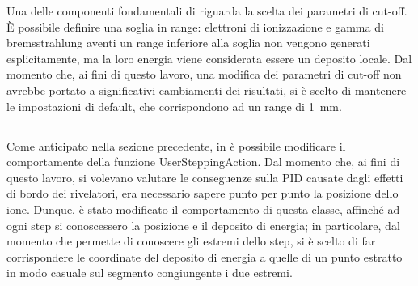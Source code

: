 Una delle componenti fondamentali di \geant{} riguarda la scelta dei parametri di cut-off.
È possibile definire una soglia in range: elettroni di ionizzazione e gamma di bremsstrahlung aventi un range inferiore alla soglia non vengono generati esplicitamente, ma la loro energia viene considerata essere un deposito locale.
Dal momento che, ai fini di questo lavoro, una modifica dei parametri di cut-off non avrebbe portato a significativi cambiamenti dei risultati, si è scelto di mantenere le impostazioni di default, che corrispondono ad un range di 1~mm.



\subsection{}

Come anticipato nella sezione precedente, in \geant{} è possibile modificare il comportamente della funzione UserSteppingAction.
Dal momento che, ai fini di questo lavoro, si volevano valutare le conseguenze sulla PID causate dagli effetti di bordo dei rivelatori, era necessario sapere punto per punto la posizione dello ione. 
Dunque, è stato modificato il comportamento di questa classe, affinché ad ogni step si conoscessero la posizione e il deposito di energia; in particolare, dal momento che \geant{} permette di conoscere gli estremi dello step, si è scelto di far corrispondere le coordinate del deposito di energia a quelle di un punto estratto in modo casuale sul segmento congiungente i due estremi.








\subsection{}

